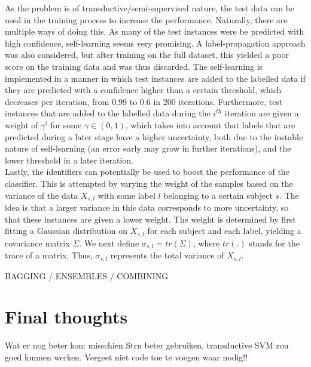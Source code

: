 \documentclass [a4paper] {report}
\begin{document}
	\noindent
	As the problem is of transductive/semi-supervised nature, the test data can be used in the training process to increase the performance. Naturally, there are multiple ways of doing this. As many of the test instances were be predicted with high confidence, self-learning  seems very promising. A label-propagation approach was also considered, but after training on the full dataset, this yielded a poor score on the training data and was thus discarded. The self-learning is implemented in a manner in which test instances are added to the labelled data if they are predicted with a confidence higher than a certain threshold, which decreases per iteration, from 0.99 to 0.6 in 200 iterations. Furthermore, test instances that are added to the labelled data during the $i^{th}$ iteration are given a weight of $\gamma^{i}$ for some $\gamma \in (0,1)$, which takes into account that labels that are predicted during a later stage have a higher uncertainty, both due to the instable nature of self-learning (an error early may grow in further iterations), and the lower threshold in a later iteration.\\
	
	\noindent
	Lastly, the identifiers can potentially be used to boost the performance of the classifier. This is attempted by varying the weight of the samples based on the variance of the data $X_{s,l}$ with some label $l$ belonging to a certain subject $s$. The idea is that a larger variance in this data corresponds to more uncertainty, so that these instances are given a lower weight. The weight is determined by first fitting a Gaussian distribution on $X_{s,l}$ for each subject and each label, yielding a covariance matrix $\Sigma$. We next define $\sigma_{s,l} = tr(\Sigma)$, where $tr(.)$ stands for the trace of a matrix. Thus, $\sigma_{s,l}$ represents the total variance of $X_{s,l}$.
	
	
	
	
	\noindent
	BAGGING / ENSEMBLES / COMBINING
	
	\section*{Final thoughts}
	Wat er nog beter kon: misschien Strn beter gebruiken, transductive SVM zou goed kunnen werken.
	Vergeet niet code toe te voegen waar nodig!!
	
	
\end{document}
